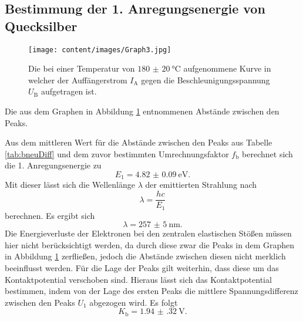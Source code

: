 \subsection{Bestimmung der 1. Anregungsenergie von Quecksilber}
\begin{figure}
	\centering
	\caption{Die bei einer Temperatur von $\SI{180(20)}{\degreeCelsius}$ aufgenommene Kurve in welcher der Auffängerstrom $I_\text{A}$ gegen die Beschleunigungsspannung $U_\text{B}$ aufgetragen ist.}
	\texttt{[image: content/images/Graph3.jpg]}
	\label{fig:b}
\end{figure}
\begin{table}
	\caption{Die aus dem Graphen in Abbildung \ref{fig:b} entnommenen Abstände zwischen den Peaks.}
	\centering
	
\end{table}
Aus dem mittleren Wert für die Abstände zwischen den Peaks aus Tabelle \ref{tab:bneuDiff} und dem zuvor bestimmten Umrechnungsfaktor $f_\text{b}$ berechnet sich die 1. Anregungsenergie zu
\begin{displaymath}
	E_1=\SI{4.82(9)}{\electronvolt}\text{.}
\end{displaymath}
Mit dieser lässt sich die Wellenlänge $\lambda$ der emittierten Strahlung nach
\begin{equation}
\lambda = \frac{h  c}{E_1}
\end{equation}
berechnen.
Es ergibt sich
\begin{displaymath}
\lambda=\SI{257(5)}{\nano\meter}\text{.}
\end{displaymath}
Die Energieverluste der Elektronen bei den zentralen elastischen Stößen müssen hier nicht berücksichtigt werden, da durch diese zwar die Peaks in dem Graphen in Abbildung \ref{fig:b} zerfließen, jedoch die Abstände zwischen diesen nicht merklich beeinflusst werden. Für die Lage der Peaks gilt weiterhin, dass diese um das Kontaktpotential verschoben sind. Hieraus lässt sich das Kontaktpotential bestimmen, indem von der Lage des ersten Peaks die mittlere Spannungsdifferenz zwischen den Peaks $U_1$ abgezogen wird. Es folgt
\begin{displaymath}
K_\text{b}=\SI{1.94(32)}{\volt}\text{.}
\end{displaymath}



